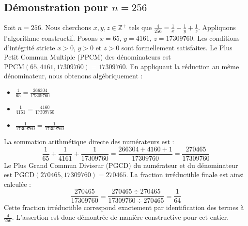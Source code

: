 \documentclass[11pt,a4paper]{article}
\begin{document}
\subsection{Démonstration pour $n = 256$}
Soit $n = 256$. Nous cherchons $x, y, z \in \mathbb{Z}^{+}$ tels que $\frac{4}{256} = \frac{1}{x} + \frac{1}{y} + \frac{1}{z}$.
Appliquons l'algorithme constructif. Posons $x = 65$, $y = 4161$, $z = 17309760$.
Les conditions d'intégrité stricte $x > 0$, $y > 0$ et $z > 0$ sont formellement satisfaites.
Le Plus Petit Commun Multiple (PPCM) des dénominateurs est $\text{PPCM}(65, 4161, 17309760) = 17309760$.
En appliquant la réduction au même dénominateur, nous obtenons algébriquement :
\begin{itemize}
    \item $\frac{1}{65} = \frac{266304}{17309760}$
    \item $\frac{1}{4161} = \frac{4160}{17309760}$
    \item $\frac{1}{17309760} = \frac{1}{17309760}$
\end{itemize}
La sommation arithmétique directe des numérateurs est :
$$ \frac{1}{65} + \frac{1}{4161} + \frac{1}{17309760} = \frac{266304 + 4160 + 1}{17309760} = \frac{270465}{17309760} $$
Le Plus Grand Commun Diviseur (PGCD) du numérateur et du dénominateur est $\text{PGCD}(270465, 17309760) = 270465$.
La fraction irréductible finale est ainsi calculée :
$$ \frac{270465}{17309760} = \frac{270465 \div 270465}{17309760 \div 270465} = \frac{1}{64} $$
Cette fraction irréductible correspond exactement par identification des termes à $\frac{4}{256}$. L'assertion est donc démontrée de manière constructive pour cet entier.
\end{document}
